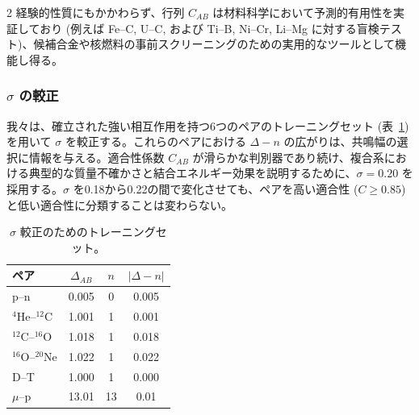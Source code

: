 \documentclass[11pt,a4paper]{article}
\theoremstyle{remark}
\begin{document}
\begin{multicols}{2}
		経験的性質にもかかわらず、行列 \(C_{AB}\) は材料科学において予測的有用性を実証しており (例えば Fe–C, U–C, および Ti–B, Ni–Cr, Li–Mg に対する盲検テスト)、候補合金や核燃料の事前スクリーニングのための実用的なツールとして機能し得る。
		
		\subsubsection{\(\sigma\) の較正}
		
		我々は、確立された強い相互作用を持つ6つのペアのトレーニングセット (表~\ref{tab:calibration}) を用いて \(\sigma\) を較正する。これらのペアにおける \(\Delta - n\) の広がりは、共鳴幅の選択に情報を与える。適合性係数 \(C_{AB}\) が滑らかな判別器であり続け、複合系における典型的な質量不確かさと結合エネルギー効果を説明するために、\(\sigma = 0.20\) を採用する。\(\sigma\) を0.18から0.22の間で変化させても、ペアを高い適合性 (\(C \ge 0.85\)) と低い適合性に分類することは変わらない。
		
		\begin{table}[H]
			\centering
			\caption{\(\sigma\) 較正のためのトレーニングセット。}
			\label{tab:calibration}
			\small
			\begin{tabular}{l c c c}
				\toprule
				ペア & \(\Delta_{AB}\) & \(n\) & \(|\Delta - n|\) \\
				\midrule
				p--n    & 0.005 & 0 & 0.005 \\
				\(^4\)He--\(^{12}\)C & 1.001 & 1 & 0.001 \\
				\(^{12}\)C--\(^{16}\)O & 1.018 & 1 & 0.018 \\
				\(^{16}\)O--\(^{20}\)Ne & 1.022 & 1 & 0.022 \\
				D--T    & 1.000 & 1 & 0.000 \\
				\(\mu\)--p & 13.01 & 13 & 0.01 \\
				\bottomrule
			\end{tabular}
		\end{table}
		
	\end{multicols}
	
\end{document}
